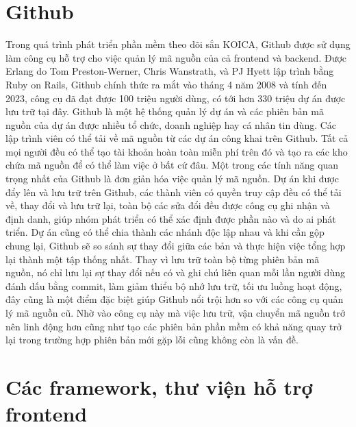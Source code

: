 \documentclass[./../main.tex]{subfiles}
\begin{document}
\section{Github}
Trong quá trình phát triển phần mềm theo dõi sắn KOICA, Github \cite{github} được sử dụng làm công cụ hỗ trợ cho việc quản lý mã nguồn của cả frontend và backend. Được Erlang do Tom Preston-Werner, Chris Wanstrath, và PJ Hyett lập trình bằng Ruby on Rails, Github chính thức ra mắt vào tháng 4 năm 2008 và tính đến 2023, công cụ đã đạt được 100 triệu người dùng, có tới hơn 330 triệu dự án được lưu trữ tại đây. Github là một hệ thống quản lý dự án và các phiên bản mã nguồn của dự án được nhiều tổ chức, doanh nghiệp hay cá nhân tin dùng. Các lập trình viên có thể tải về mã nguồn từ các dự án công khai trên Github. Tất cả mọi người đều có thể tạo tài khoản hoàn toàn miễn phí trên đó và tạo ra các kho chứa mã nguồn để có thể làm việc ở bất cứ đâu. Một trong các tính năng quan trọng nhất của Github là đơn giản hóa việc quản lý mã nguồn. Dự án khi được đẩy lên và lưu trữ trên Github, các thành viên có quyền truy cập đều có thể tải về, thay đổi và lưu trữ lại, toàn bộ các sửa đổi đều được công cụ ghi nhận và định danh, giúp nhóm phát triển có thể xác định được phần nào và do ai phát triển. Dự án cũng có thể chia thành các nhánh độc lập nhau và khi cần gộp chung lại, Github sẽ so sánh sự thay đổi giữa các bản và thực hiện việc tổng hợp lại thành một tập thống nhất. Thay vì lưu trữ toàn bộ từng phiên bản mã nguồn, nó chỉ lưu lại sự thay đổi nếu có và ghi chú liên quan mỗi lần người dùng đánh dấu bằng commit, làm giảm thiểu bộ nhớ lưu trữ, tối ưu luồng hoạt động, đây cũng là một điểm đặc biệt giúp Github nổi trội hơn so với các công cụ quản lý mã nguồn cũ. Nhờ vào công cụ này mà việc lưu trữ, vận chuyển mã nguồn trở nên linh động hơn cũng như tạo các phiên bản phần mềm có khả năng quay trở lại trong trường hợp phiên bản mới gặp lỗi cũng không còn là vấn đề. 

\section{Các framework, thư viện hỗ trợ frontend}
\end{document}
